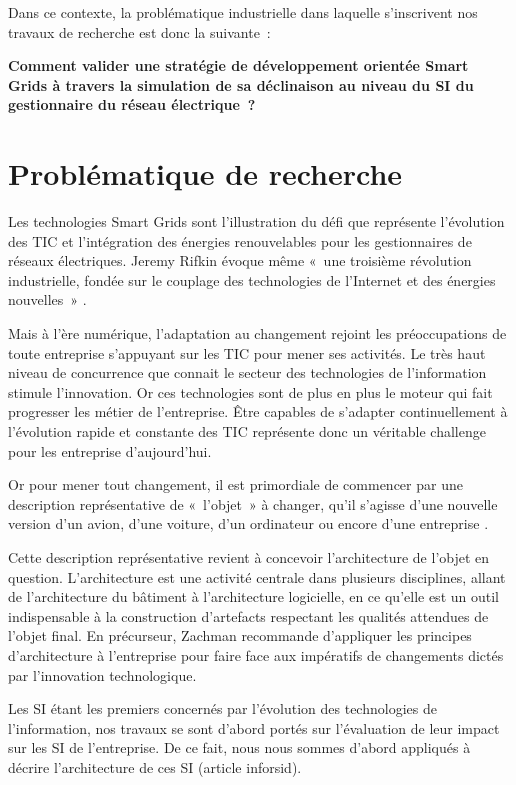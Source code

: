 Dans ce contexte, la problématique industrielle dans laquelle  s'inscrivent nos 
travaux de recherche est donc la suivante~: 

\textbf{Comment valider une stratégie de développement orientée Smart Grids à 
travers la simulation de sa déclinaison au niveau du SI du gestionnaire du 
réseau électrique~?}

 
\section{Problématique de recherche}

Les technologies Smart Grids sont l'illustration du défi que représente 
l'évolution des TIC et l'intégration des énergies renouvelables pour les gestionnaires de réseaux 
électriques. Jeremy Rifkin évoque même «~une troisième révolution 
industrielle, fondée sur le couplage des technologies de l’Internet et des 
énergies nouvelles~» \cite{rifkin2012troisieme}. 

Mais à l'ère numérique, l'adaptation au changement rejoint les préoccupations de 
toute entreprise s'appuyant sur les TIC pour mener ses 
activités. Le très haut niveau de concurrence que connait le secteur des 
technologies de l'information stimule l'innovation. Or ces technologies sont de plus en plus le moteur qui fait progresser les  métier de 
l'entreprise. Être capables de s'adapter continuellement à l'évolution rapide et 
constante des TIC représente donc un véritable 
challenge pour les entreprise d'aujourd'hui. 

Or pour mener tout changement, il est primordiale de commencer par une 
description représentative de «~l'objet~» à changer, qu'il s'agisse d'une nouvelle 
version d'un avion, d'une voiture, d'un ordinateur ou encore d'une entreprise \cite{zachman1997enterprise}.

Cette description représentative revient à concevoir l'architecture de l'objet 
en question. L'architecture est une activité centrale dans plusieurs 
disciplines, allant de l'architecture du bâtiment à l'architecture logicielle, 
en ce qu'elle est un outil indispensable à la construction d'artefacts 
respectant les qualités attendues de l'objet final. En précurseur, Zachman \cite{zachman1997enterprise} recommande d'appliquer les principes d'architecture à l'entreprise pour faire face aux impératifs de changements dictés par l'innovation technologique.

Les SI étant les premiers concernés par l'évolution des technologies de 
l'information, nos travaux se sont d'abord portés sur l'évaluation de leur impact 
sur les SI de l'entreprise. De ce fait, nous nous sommes d'abord appliqués à 
décrire l'architecture de ces SI (article inforsid). 

